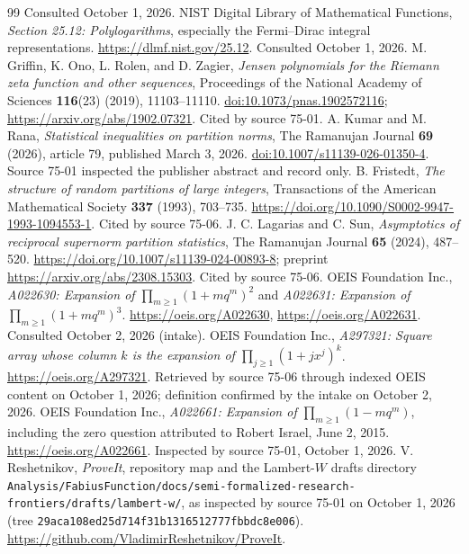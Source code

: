 \documentclass[11pt]{article}
\numberwithin{equation}{section}
\theoremstyle{definition}\newtheorem{definition}[theorem]{Definition}
\theoremstyle{remark}\newtheorem{remark}[theorem]{Remark}
\begin{document}
{\begin{thebibliography}{99}
Consulted October 1, 2026.
 NIST Digital Library of Mathematical Functions,
\emph{Section 25.12: Polylogarithms}, especially the Fermi--Dirac integral
representations. \url{https://dlmf.nist.gov/25.12}. Consulted October 1, 2026.
 M. Griffin, K. Ono, L. Rolen, and D. Zagier, \emph{Jensen
polynomials for the Riemann zeta function and other sequences}, Proceedings of
the National Academy of Sciences \textbf{116}(23) (2019), 11103--11110.
\href{https://doi.org/10.1073/pnas.1902572116}{doi:10.1073/pnas.1902572116};
\url{https://arxiv.org/abs/1902.07321}.  Cited by source 75-01.
 A. Kumar and M. Rana, \emph{Statistical inequalities on
partition norms}, The Ramanujan Journal \textbf{69} (2026), article 79,
published March 3, 2026.
\href{https://doi.org/10.1007/s11139-026-01350-4}{doi:10.1007/s11139-026-01350-4}.
Source 75-01 inspected the publisher abstract and record only.
 B. Fristedt, \emph{The structure of random partitions of
large integers}, Transactions of the American Mathematical Society
\textbf{337} (1993), 703--735.
\url{https://doi.org/10.1090/S0002-9947-1993-1094553-1}.  Cited by source 75-06.
 J. C. Lagarias and C. Sun, \emph{Asymptotics of reciprocal
supernorm partition statistics}, The Ramanujan Journal \textbf{65} (2024),
487--520. \url{https://doi.org/10.1007/s11139-024-00893-8}; preprint
\url{https://arxiv.org/abs/2308.15303}.  Cited by source 75-06.
 OEIS Foundation Inc., \emph{A022630: Expansion of
$\prod_{m\ge1}(1+mq^m)^2$} and \emph{A022631: Expansion of
$\prod_{m\ge1}(1+mq^m)^3$}. \url{https://oeis.org/A022630},
\url{https://oeis.org/A022631}.  Consulted October 2, 2026 (intake).
 OEIS Foundation Inc., \emph{A297321: Square array whose
column $k$ is the expansion of $\prod_{j\ge1}(1+jx^j)^k$}.
\url{https://oeis.org/A297321}.  Retrieved by source 75-06 through indexed
OEIS content on October 1, 2026; definition confirmed by the intake on
October 2, 2026.
 OEIS Foundation Inc., \emph{A022661: Expansion of
$\prod_{m\ge1}(1-mq^m)$}, including the zero question attributed to Robert
Israel, June 2, 2015. \url{https://oeis.org/A022661}.  Inspected by source
75-01, October 1, 2026.
 V. Reshetnikov, \emph{ProveIt}, repository map and the
Lambert-$W$ drafts directory
\nolinkurl{Analysis/FabiusFunction/docs/semi-formalized-research-frontiers/drafts/lambert-w/},
as inspected by source 75-01 on October 1, 2026 (tree
\texttt{29aca108ed25d714f31b1316512777fbbdc8e006}).
\url{https://github.com/VladimirReshetnikov/ProveIt}.

\end{thebibliography}}
\end{document}
